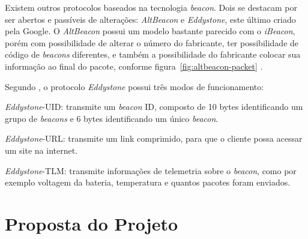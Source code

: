 \documentclass[
	12pt,				%
	openright,			%
	oneside,			%
	a4paper,			%
	chapter=TITLE,		%
	english,			%
	brazil				%
	]{abntex2}
\begin{document}
{Existem outros protocolos baseados na tecnologia \textit{beacon}. Dois se destacam por ser abertos e passíveis de alterações: \textit{AltBeacon} e \textit{Eddystone}, este último criado pela Google. O \textit{AltBeacon} possui um modelo bastante parecido com o \textit{iBeacon}, porém com possibilidade de alterar o número do fabricante, ter possibilidade de código de \textit{beacons} diferentes, e também a possibilidade do fabricante colocar sua informação ao final do pacote, conforme figura~\ref{fig:altbeacon-packet} \cite{arm-beacons}.

\begin{figure}[h!]
\end{figure}

Segundo , o protocolo \textit{Eddystone} possui três modos de funcionamento:
\begin{alineas}
	\item \textit{Eddystone}-UID: transmite um \textit{beacon} ID, composto de 10 bytes identificando um grupo de \textit{beacons} e  6 bytes identificando um único \textit{beacon}.
	\item \textit{Eddystone}-URL: transmite um link comprimido, para que o cliente possa acessar um site na internet.
	\item \textit{Eddystone}-TLM: transmite informações de telemetria sobre o \textit{beacon}, como por exemplo voltagem da bateria, temperatura e quantos pacotes foram enviados.
\end{alineas}



\chapter{Proposta do Projeto}

}
\end{document}
